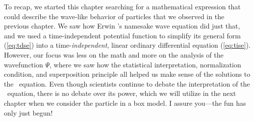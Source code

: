 To recap, we started this chapter searching for a mathematical expression that could describe the wave-like behavior of particles that we observed in the previous chapter. 
We saw how Erwin \Sch's namesake wave equation did just that, and we used a time-independent potential function to simplify its general form (\autoref{eq:tdse}) into a time-\emph{independent}, linear ordinary differential equation (\autoref{eq:tise}). 
However, our focus was less on the math and more on the analysis of the wavefunction $\Psi$, where we saw how the statistical interpretation, normalization condition, and superposition principle all helped us make sense of the solutions to the \Sch\ equation. 
Even though scientists continue to debate the interpretation of the \Sch\ equation, there is no debate over its power, which we will utilize in the next chapter when we consider the particle in a box model. 
I assure you---the fun has only just begun!

%